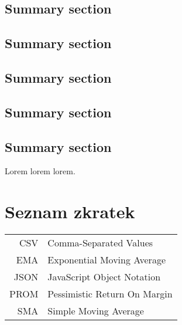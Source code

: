 \documentclass[czech,master,unicode]{ctufit-thesis}
\theoremstyle{plain}
\theoremstyle{definition}
\theoremstyle{remark}
\numberwithin{theorem}{chapter}
\begin{document}
\printabstractpage %

\begin{summarypage}
\section*{Summary section}

\lipsum[1][1-8]

\section*{Summary section}

\lipsum[2][1-6]

\section*{Summary section}

\lipsum[3]

\section*{Summary section}

\lipsum[2]

\section*{Summary section}

\lipsum[1][1-8] Lorem lorem lorem.
\end{summarypage}

\chapter{Seznam zkratek}
	
\begin{tabular}{rl}
CSV & Comma-Separated Values\\
EMA & Exponential Moving Average\\
JSON & JavaScript Object Notation\\
PROM & Pessimistic Return On Margin\\
SMA & Simple Moving Average\\
\end{tabular}
\end{document}
